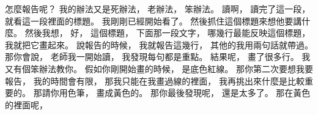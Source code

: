 \hypertarget{w01:cue:2800}{}怎麼報告呢？
\hypertarget{w01:cue:2801}{}我的辦法又是死辦法，
\hypertarget{w01:cue:2802}{}老辦法，
\hypertarget{w01:cue:2803}{}笨辦法。
\hypertarget{w01:cue:2804}{}讀啊，
\hypertarget{w01:cue:2805}{}讀完了這一段，
\hypertarget{w01:cue:2806}{}就看這一段裡面的標題。
\hypertarget{w01:cue:2807}{}我剛剛已經開始看了。
\hypertarget{w01:cue:2808}{}然後抓住這個標題來想他要講什麼。
\hypertarget{w01:cue:2809}{}然後我想，
\hypertarget{w01:cue:2810}{}好，
\hypertarget{w01:cue:2811}{}這個標題，
\hypertarget{w01:cue:2812}{}下面那一段文字，
\hypertarget{w01:cue:2813}{}哪幾行最能反映這個標題，
\hypertarget{w01:cue:2814}{}我就把它畫起來。
\hypertarget{w01:cue:2815}{}說報告的時候，
\hypertarget{w01:cue:2816}{}我就報告這幾行，
\hypertarget{w01:cue:2817}{}其他的我用兩句話就帶過。
\hypertarget{w01:cue:2818}{}那你會說，
\hypertarget{w01:cue:2819}{}老師我一開始讀，
\hypertarget{w01:cue:2820}{}我發現每句都是重點。
\hypertarget{w01:cue:2821}{}結果呢，
\hypertarget{w01:cue:2822}{}畫了很多行。
\hypertarget{w01:cue:2823}{}我又有個笨辦法教你。
\hypertarget{w01:cue:2824}{}假如你剛開始畫的時候，
\hypertarget{w01:cue:2825}{}是底色紅線。
\hypertarget{w01:cue:2826}{}那你第二次要想我要報告，
\hypertarget{w01:cue:2827}{}我的時間會有限，
\hypertarget{w01:cue:2828}{}那我只能在我畫過線的裡面，
\hypertarget{w01:cue:2829}{}我再挑出來什麼是比較重要的。
\hypertarget{w01:cue:2830}{}那請你用色筆，
\hypertarget{w01:cue:2831}{}畫成黃色的。
\hypertarget{w01:cue:2832}{}那你最後發現呢，
\hypertarget{w01:cue:2833}{}還是太多了。
\hypertarget{w01:cue:2834}{}那在黃色的裡面呢，
